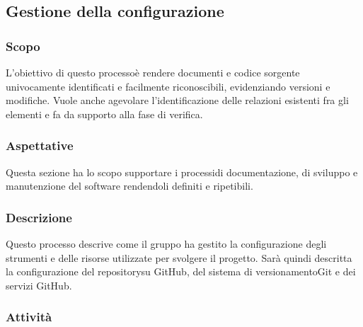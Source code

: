 \subsection{Gestione della configurazione}
	\subsubsection{Scopo}
		L'obiettivo di questo processo\glosp è rendere documenti e codice sorgente univocamente identificati e facilmente riconoscibili, evidenziando versioni e modifiche. Vuole anche agevolare l'identificazione delle relazioni esistenti fra gli elementi e fa da supporto alla fase di verifica.
	\subsubsection{Aspettative}
		Questa sezione ha lo scopo supportare i processi\glosp di documentazione, di sviluppo e manutenzione del software rendendoli definiti e ripetibili.  
	\subsubsection{Descrizione} 
		Questo processo descrive come il gruppo ha gestito la configurazione degli strumenti e delle risorse utilizzate per svolgere il progetto\glo.
		Sarà quindi descritta la configurazione del repository\glosp su GitHub, del sistema di versionamento\glosp Git e dei servizi GitHub.
	\subsubsection{Attività}
